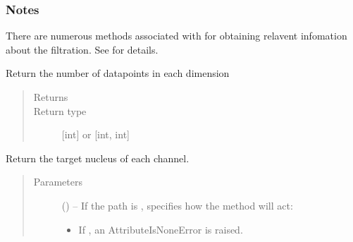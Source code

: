 \documentclass[letterpaper,10pt,english]{sphinxmanual}
\begin{document}
\begin{fulllineitems}
\begin{fulllineitems}
\begin{quote}
\begin{description}
\end{description}\end{quote}
\subsubsection*{Notes}

\sphinxAtStartPar
There are numerous methods associated with  for
obtaining relavent infomation about the filtration. See
{\hyperref[\detokenize{references/freqfilter:nmrespy.freqfilter.FrequencyFilter}]{}} for details.

\end{fulllineitems}


\begin{fulllineitems}
\label{\detokenize{references/core:nmrespy.core.Estimator.get_n}}
\sphinxAtStartPar
Return the number of datapoints in each dimension
\begin{quote}\begin{description}
\item[{Returns}] \leavevmode
\sphinxAtStartPar
{}

\item[{Return type}] \leavevmode
\sphinxAtStartPar
{[}int{]} or {[}int, int{]}

\end{description}\end{quote}

\end{fulllineitems}


\begin{fulllineitems}
\label{\detokenize{references/core:nmrespy.core.Estimator.get_nucleus}}
\sphinxAtStartPar
Return the target nucleus of each channel.
\begin{quote}\begin{description}
\item[{Parameters}] \leavevmode
\sphinxAtStartPar
{} (\sphinxstyleliteralemphasis{\sphinxupquote{, }}) – 
\sphinxAtStartPar
If the path is ,  specifies how the method will act:
\begin{itemize}
\item {} 
\sphinxAtStartPar
If , an AttributeIsNoneError is raised.


\end{itemize}
\end{description}
\end{quote}
\end{fulllineitems}
\end{fulllineitems}
\end{document}
